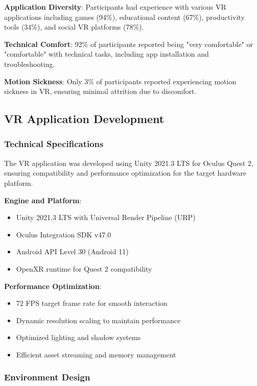 \documentclass[12pt]{article}
\begin{document}
\textbf{Application Diversity}: Participants had experience with various VR applications including games (94\%), educational content (67\%), productivity tools (34\%), and social VR platforms (78\%).

\textbf{Technical Comfort}: 92\% of participants reported being "very comfortable" or "comfortable" with technical tasks, including app installation and troubleshooting.

\textbf{Motion Sickness}: Only 3\% of participants reported experiencing motion sickness in VR, ensuring minimal attrition due to discomfort.

\subsection{VR Application Development}

\subsubsection{Technical Specifications}

The VR application was developed using Unity 2021.3 LTS for Oculus Quest 2, ensuring compatibility and performance optimization for the target hardware platform.

\textbf{Engine and Platform}:
\begin{itemize}
    \item Unity 2021.3 LTS with Universal Render Pipeline (URP)
    \item Oculus Integration SDK v47.0
    \item Android API Level 30 (Android 11)
    \item OpenXR runtime for Quest 2 compatibility
\end{itemize}

\textbf{Performance Optimization}:
\begin{itemize}
    \item 72 FPS target frame rate for smooth interaction
    \item Dynamic resolution scaling to maintain performance
    \item Optimized lighting and shadow systems
    \item Efficient asset streaming and memory management
\end{itemize}

\subsubsection{Environment Design}
\end{document}
